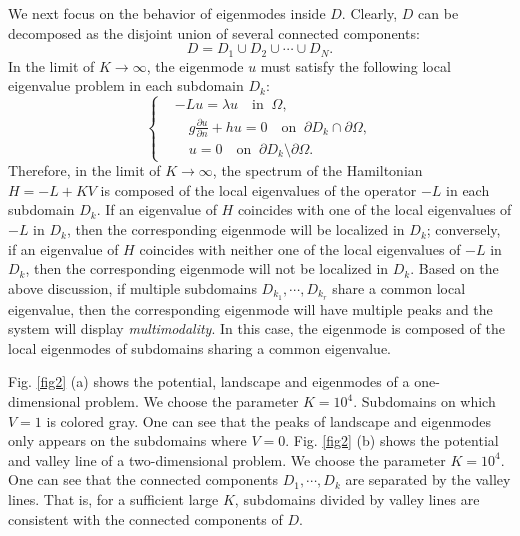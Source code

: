 \documentclass[a4paper,11pt]{article}
\begin{document}
We next focus on the behavior of eigenmodes inside $D$. Clearly, $D$ can be decomposed as the disjoint union of several connected components:
\begin{equation*}
D = D_1 \cup D_2 \cup \cdots \cup D_N.
\end{equation*}
In the limit of $K\rightarrow\infty$, the eigenmode $u$ must satisfy the following local eigenvalue problem in each subdomain $D_k$:
\begin{equation}\label{subdomain}
\left\{
\begin{split}
& - L u = \lambda u \quad \textrm{in}\;\;\Omega, \\
& \quad g \frac{\partial u}{\partial n} + h u = 0 \quad \textrm{on}\;\;\partial D_k \cap \partial \Omega, \\
& \quad u = 0 \quad \textrm{on}\;\;\partial D_k \setminus \partial \Omega.
\end{split}
\right.
\end{equation}
Therefore, in the limit of $K \rightarrow \infty$, the spectrum of the Hamiltonian $H = - L + K V$ is composed of the local eigenvalues of the operator $-L$ in each subdomain $D_k$. If an eigenvalue of $H$ coincides with one of the local eigenvalues of $-L$ in $D_k$, then the corresponding eigenmode will be localized in $D_k$; conversely, if an eigenvalue of $H$ coincides with neither one of the local eigenvalues of $-L$ in $D_k$, then the corresponding eigenmode will not be localized in $D_k$. Based on the above discussion, if multiple subdomains $D_{k_1}, \cdots, D_{k_r}$ share a common local eigenvalue, then the corresponding eigenmode will have multiple peaks and the system will display \emph{multimodality}. In this case, the eigenmode is composed of the local eigenmodes of subdomains sharing a common eigenvalue.

Fig. \ref{fig2} (a) shows the potential, landscape and eigenmodes of a one-dimensional problem. We choose the parameter $K = 10^4$. Subdomains on which $V = 1$ is colored gray. One can see that the peaks of landscape and eigenmodes only appears on the subdomains where $V = 0$. Fig. \ref{fig2} (b) shows the potential and valley line of a two-dimensional problem. We choose the parameter $K = 10^4$. One can see that the connected components $D_1, \cdots, D_k$ are separated by the valley lines. That is, for a sufficient large $K$, subdomains divided by valley lines are consistent with the connected components of $D$.
\end{document}
